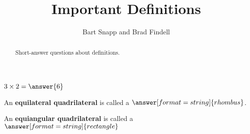 \documentclass[nooutcomes]{ximera}
\title{Important Definitions}
\author{Bart Snapp and Brad Findell}
\begin{document}
\begin{abstract}
Short-answer questions about definitions. 
\end{abstract}
\maketitle

%

\begin{question}  
$3\times 2 = \answer{6}$  
\end{question}


\begin{question}  
An \textbf{equilateral quadrilateral} is called a $\answer[format=string]{rhombus}$.
\end{question}


\begin{question}  
An \textbf{equiangular quadrilateral} is called a $\answer[format=string]{rectangle}$
\end{question}


\end{document}
